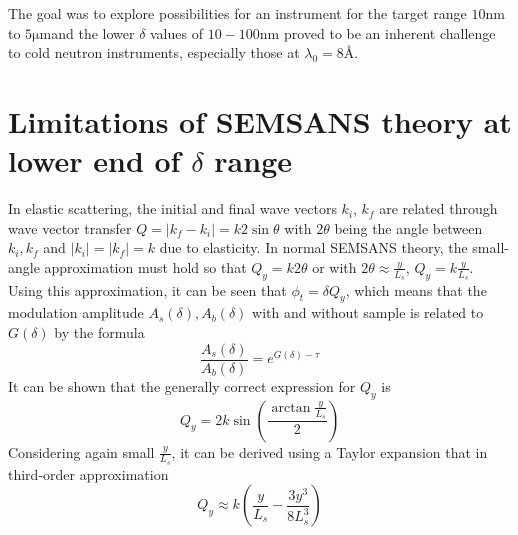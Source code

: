 \documentclass{article}
\newcommand{\targetrange}{$10 \unit{\nano\meter}$ to $5 \unit{\micro\meter}$}
\begin{document}
The goal was to explore possibilities for an instrument for the target range \targetrange and the lower $\delta$ values of $10 - 100 \unit{\nano\meter}$ proved to be an inherent challenge to cold neutron instruments, especially those at $\lambda_0 = 8$Å. 


\printbibliography

\appendix
\section{Limitations of SEMSANS theory at lower end of $\delta$ range}
\label{appendix-a}
In elastic scattering, the initial and final wave vectors $k_i$, $k_f$ are related through wave vector transfer $Q = |k_f - k_i| = k 2\sin\theta$ with $2\theta$ being the angle between $k_i, k_f$ and $|k_i| = |k_f| = k$ due to elasticity. In normal SEMSANS theory, the small-angle approximation must hold so that $Q_y = k2\theta$ or with $2\theta \approx \frac{y}{L_s}$, $Q_y = k\frac{y}{L_s}$. Using this approximation, it can be seen that $\phi_t = \delta Q_y$, which means that the modulation amplitude $A_s(\delta), A_b(\delta)$ with and without sample is related to $G(\delta)$
by the formula
$$\frac{A_s(\delta)}{A_b(\delta)} = e^{G(\delta) - \tau}$$
It can be shown that the generally correct expression for $Q_y$ is 
$$Q_y = 2k\sin(\frac{\arctan\frac{y}{L_s}}{2})$$
Considering again small $\frac{y}{L_s}$, it can be derived using a Taylor expansion that in third-order approximation 
$$Q_y \approx  k(\frac{y}{L_s} - \frac{3y^3}{8L_s^3})$$
\end{document}
